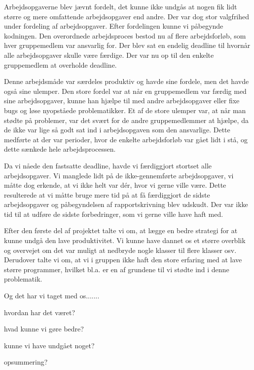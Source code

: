 Arbejdsopgaverne blev jævnt fordelt, det kunne ikke undgås at nogen fik lidt større og mere omfattende arbejdsopgaver end andre. Der var dog stor valgfrihed under fordeling af arbejdsopgaver. Efter fordelingen kunne vi påbegynde kodningen. Den overordnede arbejdsproces bestod nu af flere arbejdsforløb, som hver gruppemedlem var ansvarlig for. Der blev sat en endelig deadline til hvornår alle arbejdsopgaver skulle være færdige. Der var nu op til den enkelte gruppemedlem at overholde deadline. 

Denne arbejdsmåde var særdeles produktiv og havde sine fordele, men det havde også sine ulemper. Den store fordel var at når en gruppemedlem var færdig med sine arbejdsopgaver, kunne han hjælpe til med andre arbejdsopgaver eller fixe bugs og løse nyopståede problematikker. Et af de store ulemper var, at når man stødte på problemer, var det svært for de andre gruppemedlemmer at hjælpe, da de ikke var lige så godt sat ind i arbejdsopgaven som den ansvarlige. Dette medførte at der var perioder, hvor de enkelte arbejdsforløb var gået lidt i stå, og dette sænkede hele arbejdsprocessen. 

Da vi nåede den fastsatte deadline, havde vi færdiggjort stortset alle arbejdsopgaver. Vi manglede lidt på de ikke-gennemførte arbejdsopgaver, vi måtte dog erkende, at vi ikke helt var dér, hvor vi gerne ville være. Dette resulterede at vi måtte bruge mere tid på at få færdiggjort de sidste arbejdsopgaver og påbegyndelsen af rapportskrivning blev udskudt. Der var ikke tid til at udføre de sidste forbedringer, som vi gerne ville have haft med. 

Efter den første del af projektet talte vi om, at lægge en bedre strategi for at kunne undgå den lave produktivitet. Vi kunne have dannet os et større overblik og overvejet om det var muligt at nedbryde nogle klasser til flere klasser osv. Derudover talte vi om, at vi i gruppen ikke haft den store erfaring med at lave større programmer, hvilket bl.a. er en af grundene til  vi stødte ind i denne problematik. 

Og det har vi taget med os.......

hvordan har det været?

hvad kunne vi gøre bedre?

kunne vi have undgået noget?

opsummering?